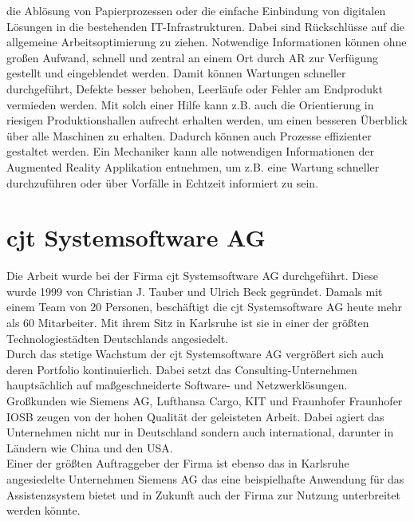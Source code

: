 die Ablösung von Papierprozessen oder die einfache Einbindung von digitalen Lösungen in die bestehenden IT-Infrastrukturen. \cite{industrie40ar.2019n} 
Dabei sind Rückschlüsse auf die allgemeine Arbeitsoptimierung zu ziehen. Notwendige Informationen können ohne 
großen Aufwand, schnell und zentral an einem Ort durch AR zur Verfügung gestellt und eingeblendet werden. Damit können 
Wartungen schneller durchgeführt, Defekte besser behoben, Leerläufe oder Fehler am Endprodukt vermieden werden. Mit solch einer Hilfe 
kann z.B. auch die Orientierung in riesigen Produktionshallen aufrecht erhalten werden, um einen besseren Überblick über alle Maschinen 
zu erhalten. Dadurch können auch Prozesse effizienter gestaltet werden. Ein Mechaniker kann alle notwendigen Informationen der Augmented 
Reality Applikation entnehmen, um z.B. eine Wartung schneller durchzuführen oder über Vorfälle in Echtzeit informiert zu sein. 

\section{cjt Systemsoftware AG}
\label{chap:cjt}
Die Arbeit wurde bei der Firma cjt Systemsoftware AG durchgeführt. Diese wurde
1999 von Christian J. Tauber und Ulrich Beck gegründet. Damals mit einem Team
von 20 Personen, beschäftigt die cjt Systemsoftware AG heute mehr als 60 Mitarbeiter. 
Mit ihrem Sitz in Karlsruhe ist sie in einer der größten Technologiestädten Deutschlands angesiedelt.
\\
\linebreak
Durch das stetige Wachstum der cjt Systemsoftware AG vergrößert sich auch deren
Portfolio kontinuierlich. Dabei setzt das Consulting-Unternehmen hauptsächlich auf maßgeschneiderte
Software- und Netzwerklösungen. Großkunden wie Siemens AG, Lufthansa Cargo,
\ac{KIT} und Fraunhofer \acs{Fraunhofer IOSB} zeugen von der hohen Qualität der geleisteten Arbeit. 
Dabei agiert das Unternehmen nicht nur in Deutschland sondern auch international, darunter in Ländern wie China und den USA.
\\ 
\linebreak
Einer der größten Auftraggeber der Firma ist ebenso das in Karlsruhe angesiedelte Unternehmen Siemens AG das eine beispielhafte 
Anwendung für das Assistenzsystem bietet und in Zukunft auch der Firma zur Nutzung unterbreitet werden könnte. 
\pagebreak

